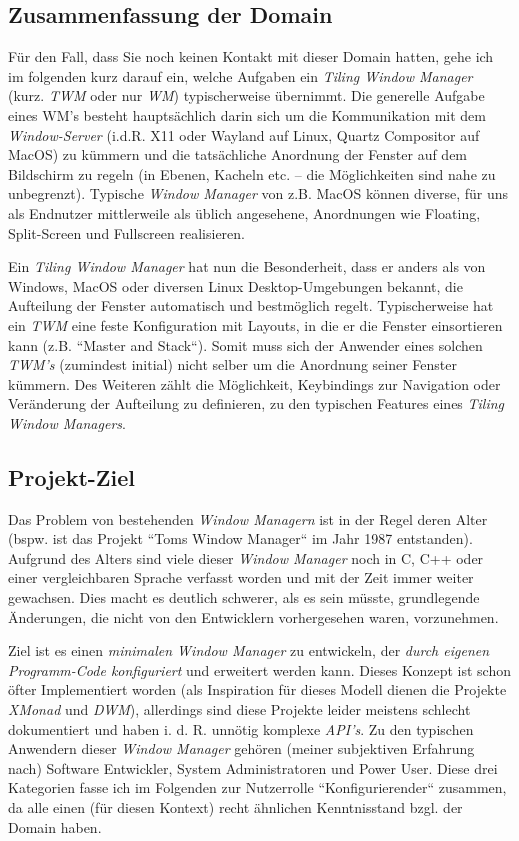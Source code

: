 \documentclass{article}
\begin{document}
\subsection{Zusammenfassung der Domain}

Für den Fall, dass Sie noch keinen Kontakt mit dieser Domain hatten, gehe ich im folgenden kurz darauf ein,
welche Aufgaben ein \emph{Tiling Window Manager} (kurz. \emph{TWM} oder nur \emph{WM}) typischerweise
übernimmt. Die generelle Aufgabe eines WM's besteht hauptsächlich darin sich um die Kommunikation mit dem
\emph{Window-Server} (i.d.R. X11 oder Wayland auf Linux, Quartz Compositor auf MacOS) zu kümmern und die
tatsächliche Anordnung der Fenster auf dem Bildschirm zu regeln (in Ebenen, Kacheln etc. – die Möglichkeiten
sind nahe zu unbegrenzt). Typische \emph{Window Manager} von z.B. MacOS können diverse, für uns als Endnutzer
mittlerweile als üblich angesehene, Anordnungen wie Floating, Split-Screen und Fullscreen realisieren. \par
Ein \emph{Tiling Window Manager} hat nun die Besonderheit, dass er anders als von Windows, MacOS oder diversen
Linux Desktop-Umgebungen bekannt, die Aufteilung der Fenster automatisch und bestmöglich regelt. Typischerweise
hat ein \emph{TWM} eine feste Konfiguration mit Layouts, in die er die Fenster einsortieren kann (z.B. ``Master
and Stack``). Somit muss sich der Anwender eines solchen \emph{TWM's} (zumindest initial) nicht selber um die
Anordnung seiner Fenster kümmern. Des Weiteren zählt die Möglichkeit, Keybindings zur Navigation oder Veränderung
der Aufteilung zu definieren, zu den typischen Features eines \emph{Tiling Window Managers}.

\subsection{Projekt-Ziel}

Das Problem von bestehenden \emph{Window Managern} ist in der Regel deren Alter (bspw. ist das Projekt ``Toms
Window Manager`` im Jahr 1987 entstanden). Aufgrund des Alters sind viele dieser \emph{Window Manager} noch in
C, C++ oder einer vergleichbaren Sprache verfasst worden und mit der Zeit immer weiter gewachsen. Dies macht es
deutlich schwerer, als es sein müsste, grundlegende Änderungen, die nicht von den Entwicklern vorhergesehen waren,
vorzunehmen. \par
Ziel ist es einen \emph{minimalen Window Manager} zu entwickeln, der \emph{durch eigenen Programm-Code konfiguriert}
und erweitert werden kann. Dieses Konzept ist schon öfter Implementiert worden (als Inspiration für dieses Modell
dienen die Projekte \emph{XMonad\footnotemark} und \emph{DWM\footnotemark}), allerdings sind diese Projekte leider
meistens schlecht dokumentiert und haben i. d. R. unnötig komplexe \emph{API's}. Zu den typischen Anwendern dieser
\emph{Window Manager} gehören (meiner subjektiven Erfahrung nach) Software Entwickler, System Administratoren und
Power User. Diese drei Kategorien fasse ich im Folgenden zur Nutzerrolle ``Konfigurierender`` zusammen, da alle
einen (für diesen Kontext) recht ähnlichen Kenntnisstand bzgl. der Domain haben.
\end{document}
